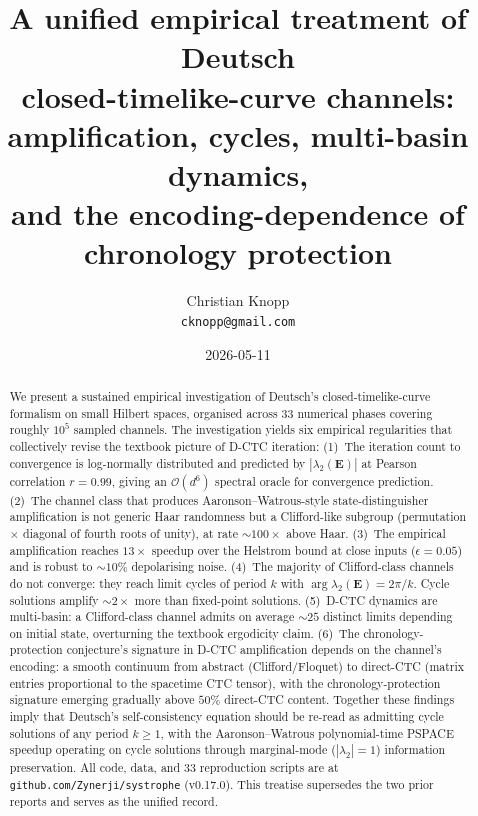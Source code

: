 \documentclass[11pt,a4paper]{article}
\title{\bfseries A unified empirical treatment of Deutsch \\
closed-timelike-curve channels: \\
amplification, cycles, multi-basin dynamics, \\
and the encoding-dependence of chronology protection}
\author{Christian Knopp\\\texttt{cknopp@gmail.com}}
\date{2026-05-11}
\begin{document}
\maketitle

\begin{abstract}
We present a sustained empirical investigation of Deutsch's
closed-timelike-curve formalism \cite{Deutsch1991} on small Hilbert
spaces, organised across 33 numerical phases covering roughly
$10^5$ sampled channels. The investigation yields six empirical
regularities that collectively revise the textbook picture of D-CTC
iteration:
(1)~The iteration count to convergence is log-normally distributed
and predicted by $|\lambda_2(\mathbf{E})|$ at Pearson correlation
$r = 0.99$, giving an $\mathcal{O}(d^6)$ spectral oracle for
convergence prediction.
(2)~The channel class that produces Aaronson--Watrous-style
\cite{AaronsonWatrous2009} state-distinguisher amplification is not
generic Haar randomness but a Clifford-like subgroup (permutation
$\times$ diagonal of fourth roots of unity), at rate
$\sim 100\times$ above Haar.
(3)~The empirical amplification reaches $13\times$ speedup over the
Helstrom bound at close inputs ($\epsilon = 0.05$) and is robust to
$\sim 10\%$ depolarising noise.
(4)~The majority of Clifford-class channels do not converge: they
reach limit cycles of period $k$ with $\arg \lambda_2(\mathbf{E}) =
2\pi/k$. Cycle solutions amplify $\sim 2\times$ more than
fixed-point solutions.
(5)~D-CTC dynamics are multi-basin: a Clifford-class channel admits
on average $\sim 25$ distinct limits depending on initial state,
overturning the textbook ergodicity claim.
(6)~The chronology-protection conjecture's signature in D-CTC
amplification depends on the channel's encoding: a smooth continuum
from abstract (Clifford/Floquet) to direct-CTC (matrix entries
proportional to the spacetime CTC tensor), with the
chronology-protection signature emerging gradually above $50\%$
direct-CTC content.
Together these findings imply that Deutsch's self-consistency
equation should be re-read as admitting cycle solutions of any
period $k \ge 1$, with the Aaronson--Watrous polynomial-time PSPACE
speedup operating on cycle solutions through marginal-mode
($|\lambda_2| = 1$) information preservation. All code, data, and
33 reproduction scripts are at \texttt{github.com/Zynerji/systrophe}
(v0.17.0). This treatise supersedes the two prior reports
\cite{Knopp2026DCTC,Knopp2026DCTCcycles} and serves as the unified
record.
\end{abstract}
\end{document}
